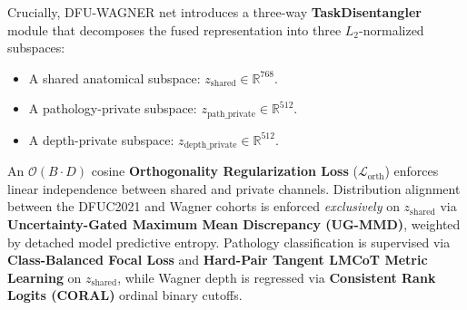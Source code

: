 \documentclass[journal]{IEEEtran}
\begin{document}
Crucially, DFU-WAGNER net introduces a three-way \textbf{TaskDisentangler} module that decomposes the fused representation into three $L_2$-normalized subspaces:
\begin{itemize}
    \item A shared anatomical subspace: $z_{\text{shared}} \in \mathbb{R}^{768}$.
    \item A pathology-private subspace: $z_{\text{path\_private}} \in \mathbb{R}^{512}$.
    \item A depth-private subspace: $z_{\text{depth\_private}} \in \mathbb{R}^{512}$.
\end{itemize}

An $\mathcal{O}(B \cdot D)$ cosine \textbf{Orthogonality Regularization Loss} ($\mathcal{L}_{\text{orth}}$) enforces linear independence between shared and private channels. Distribution alignment between the DFUC2021 and Wagner cohorts is enforced \textit{exclusively} on $z_{\text{shared}}$ via \textbf{Uncertainty-Gated Maximum Mean Discrepancy (UG-MMD)}, weighted by detached model predictive entropy. Pathology classification is supervised via \textbf{Class-Balanced Focal Loss} and \textbf{Hard-Pair Tangent LMCoT Metric Learning} on $z_{\text{shared}}$, while Wagner depth is regressed via \textbf{Consistent Rank Logits (CORAL)} ordinal binary cutoffs.
\end{document}
